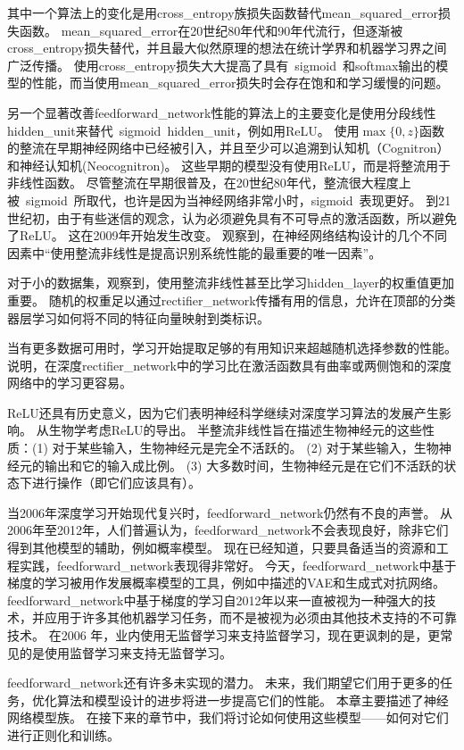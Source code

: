   
其中一个算法上的变化是用\gls{cross_entropy}族损失函数替代\gls{mean_squared_error}损失函数。
\gls{mean_squared_error}在20世纪80年代和90年代流行，但逐渐被\gls{cross_entropy}损失替代，并且最大似然原理的想法在统计学界和机器学习界之间广泛传播。
使用\gls{cross_entropy}损失大大提高了具有~\gls{sigmoid}~和softmax输出的模型的性能，而当使用\gls{mean_squared_error}损失时会存在饱和和学习缓慢的问题。

另一个显著改善\gls{feedforward_network}性能的算法上的主要变化是使用分段线性\gls{hidden_unit}来替代~\gls{sigmoid}~\gls{hidden_unit}，例如用\gls{ReLU}。
使用$\max\{0, z\}$函数的整流在早期神经网络中已经被引入，并且至少可以追溯到认知机（Cognitron）和神经认知机(Neocognitron)\citep{Fukushima75,Fukushima80}。
这些早期的模型没有使用\gls{ReLU}，而是将整流用于非线性函数。
尽管整流在早期很普及，在20世纪80年代，整流很大程度上被~\gls{sigmoid}~所取代，也许是因为当神经网络非常小时，\gls{sigmoid}~表现更好。
到21世纪初，由于有些迷信的观念，认为必须避免具有不可导点的激活函数，所以避免了\gls{ReLU}。
这在2009年开始发生改变。
\cite{Jarrett-ICCV2009-small}观察到，在神经网络结构设计的几个不同因素中``使用整流非线性是提高识别系统性能的最重要的唯一因素''。

对于小的数据集，\cite{Jarrett-ICCV2009-small}观察到，使用整流非线性甚至比学习\gls{hidden_layer}的权重值更加重要。
随机的权重足以通过\gls{rectifier_network}传播有用的信息，允许在顶部的分类器层学习如何将不同的特征向量映射到类标识。

当有更多数据可用时，学习开始提取足够的有用知识来超越随机选择参数的性能。
\cite{Glorot+al-AI-2011-small}说明，在深度\gls{rectifier_network}中的学习比在激活函数具有曲率或两侧饱和的深度网络中的学习更容易。

\gls{ReLU}还具有历史意义，因为它们表明神经科学继续对深度学习算法的发展产生影响。
\cite{Glorot+al-AI-2011-small}从生物学考虑\gls{ReLU}的导出。
半整流非线性旨在描述生物神经元的这些性质：(1) 对于某些输入，生物神经元是完全不活跃的。
(2) 对于某些输入，生物神经元的输出和它的输入成比例。
(3) 大多数时间，生物神经元是在它们不活跃的状态下进行操作（即它们应该具有）。
  
  
当2006年深度学习开始现代复兴时，\gls{feedforward_network}仍然有不良的声誉。
从2006年至2012年，人们普遍认为，\gls{feedforward_network}不会表现良好，除非它们得到其他模型的辅助，例如概率模型。
现在已经知道，只要具备适当的资源和工程实践，\gls{feedforward_network}表现得非常好。
今天，\gls{feedforward_network}中基于梯度的学习被用作发展概率模型的工具，例如中描述的\gls{VAE}和生成式对抗网络。
\gls{feedforward_network}中基于梯度的学习自2012年以来一直被视为一种强大的技术，并应用于许多其他机器学习任务，而不是被视为必须由其他技术支持的不可靠技术。
在2006 年，业内使用无监督学习来支持监督学习，现在更讽刺的是，更常见的是使用监督学习来支持无监督学习。

\gls{feedforward_network}还有许多未实现的潜力。
未来，我们期望它们用于更多的任务，优化算法和模型设计的进步将进一步提高它们的性能。
本章主要描述了神经网络模型族。
在接下来的章节中，我们将讨论如何使用这些模型——如何对它们进行正则化和训练。

  
  
